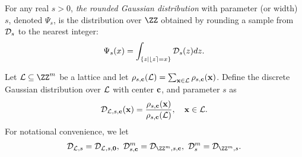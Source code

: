 \documentclass{fundam}
\begin{document}
For any real $s>0$, \textit{the rounded Gaussian distribution} with parameter (or width) $s$, denoted $\Psi_{s}$, is the distribution over $\ZZ$ obtained by rounding a sample from $\mathcal{D}_{s}$ to the nearest integer:
\begin{align*}
	\Psi_{s}(x)= \int_{\{ z\mid \lfloor z \rceil = x\}} \mathcal{D}_{s}(z)dz.
\end{align*}

Let $\Lat\subseteq \ZZ^{m}$ be a lattice and let $\rho_{s, \mathbf{c}} (\mathcal{L}) = \sum_{\mathbf{x}\in \mathcal{L}} \rho_{s, \mathbf{c}}(\mathbf{x})$. Define the discrete Gaussian distribution over $\mathcal{L}$ with center $\mathbf{c}$, and parameter $s$ as
\begin{align*}
	\mathcal{D}_{\mathcal{L}, s, \mathbf{c}} (\mathbf{x}) =  \frac{\rho_{s, \mathbf{c}}(\mathbf{x})}{\rho_{s, \mathbf{c}}(\mathcal{L})}, ~~~\mathbf{x}\in\mathcal{L}.
\end{align*}
For notational convenience, we let
\begin{align*}
	\Distr_{\Lat, s} = \Distr_{\Lat, s, \vr{0}}, ~ \Distr_{s, \vr{c}}^{m} = \Distr_{\ZZ^{m}, s, \vr{c}}, ~ \Distr_{s}^{m} = \Distr_{\ZZ^{m}, s}.
\end{align*}

\end{document}
